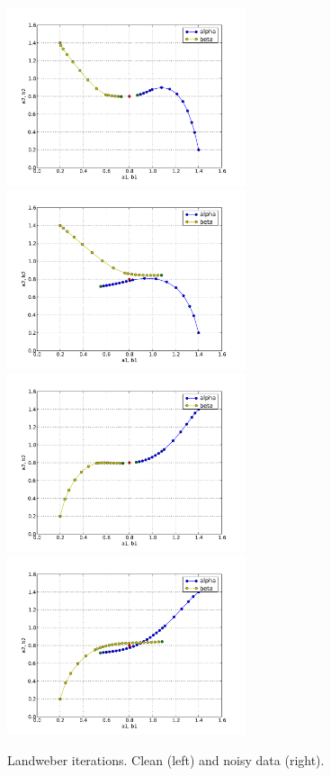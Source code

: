 \begin{figure}
\begin{center}
    \includegraphics[width=7cm]{chapters/schroll/pdf/4Dscan3.pdf}
    \includegraphics[width=7cm]{chapters/schroll/pdf/4Dscan3-5.pdf}
    \includegraphics[width=7cm]{chapters/schroll/pdf/4Dscan4.pdf}
    \includegraphics[width=7cm]{chapters/schroll/pdf/4Dscan4-5.pdf}
    \end{center}
    \vspace{-0.7cm}
  \caption{Landweber iterations. Clean (left) and noisy data (right). \label{fig3}}
\end{figure}

